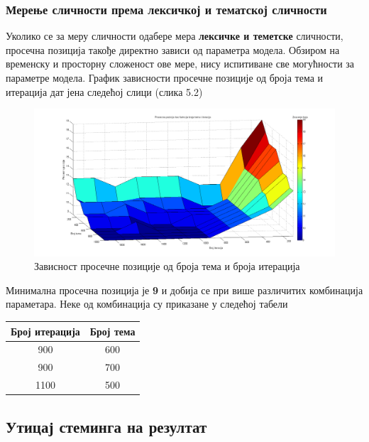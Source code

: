 	\subsubsection{Мерење сличности према лексичкој и тематској сличности}
	
Уколико се за меру сличности одабере мера  \textbf{лексичке и теметске} сличности, просечна позиција такође директно зависи од параметра модела. Обзиром на временску и просторну сложеност ове мере, нису испитиване све могућности за параметре модела. График зависности просечне позиције од броја тема и итерација дат јена следећој слици (слика 5.2)

		\begin{figure}[H]
    \centering
   \includegraphics[scale=0.3]{./Slike/distnoStemNoSyn.png} 
	\caption{Зависност просечне позиције од броја тема и броја итерација}
	\label{fig:slika1}
\end{figure}

Минимална просечна позиција је \textbf{9} и добија се при више различитих комбинација параметара. Неке од комбинација су приказане у следећој табели

\begin{center}
\begin{tabular}{|c|c|}
\hline
Број итерација & Број тема \\
\hline\hline
900 & 600 \\
900 & 700 \\
1100 & 500 \\
\hline
\end{tabular}

\end{center}


\subsection{Утицај стеминга на резултат}

